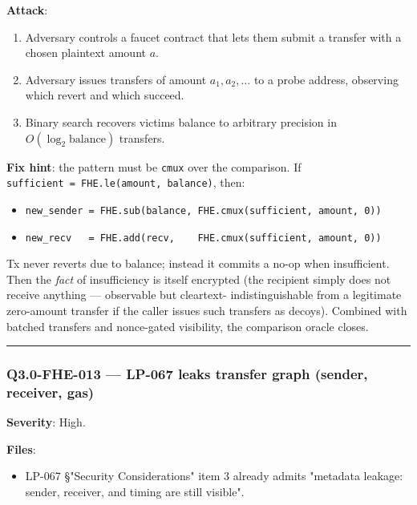 \documentclass[
]{article}
\providecommand{\tightlist}{%
  \setlength{\itemsep}{0pt}\setlength{\parskip}{0pt}}
\begin{document}
\textbf{Attack}:

\begin{enumerate}
\def\labelenumi{\arabic{enumi}.}
\tightlist
\item
  Adversary controls a faucet contract that lets them submit a transfer
  with a chosen plaintext amount \(a\).
\item
  Adversary issues transfers of amount \(a_1, a_2, \ldots\) to a probe
  address, observing which revert and which succeed.
\item
  Binary search recovers victim\textquotesingle s balance to arbitrary
  precision in \(O(\log_2 \text{balance})\) transfers.
\end{enumerate}

\textbf{Fix hint}: the pattern must be \texttt{cmux} over the
comparison. If \texttt{sufficient\ =\ FHE.le(amount,\ balance)}, then:

\begin{itemize}
\tightlist
\item
  \texttt{new\_sender\ =\ FHE.sub(balance,\ FHE.cmux(sufficient,\ amount,\ 0))}
\item
  \texttt{new\_recv\ \ \ =\ FHE.add(recv,\ \ \ \ FHE.cmux(sufficient,\ amount,\ 0))}
\end{itemize}

Tx never reverts due to balance; instead it commits a no-op when
insufficient. Then the \emph{fact} of insufficiency is itself encrypted
(the recipient simply does not receive anything --- observable but
cleartext- indistinguishable from a legitimate zero-amount transfer if
the caller issues such transfers as decoys). Combined with batched
transfers and nonce-gated visibility, the comparison oracle closes.

\begin{center}\rule{0.5\linewidth}{0.5pt}\end{center}

\subsubsection{Q3.0-FHE-013 --- LP-067 leaks transfer graph (sender,
receiver,
gas)}\label{q30-fhe-013--lp-067-leaks-transfer-graph-sender-receiver-gas}

\textbf{Severity}: High.

\textbf{Files}:

\begin{itemize}
\tightlist
\item
  LP-067 §"Security Considerations" item 3 already admits "metadata
  leakage: sender, receiver, and timing are still visible".
\end{itemize}
\end{document}
